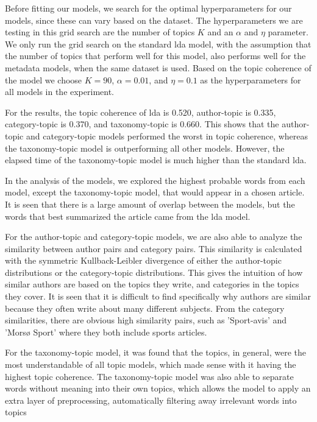 Before fitting our models, we search for the optimal hyperparameters for our models, since these can vary based on the dataset.
The hyperparameters we are testing in this grid search are the number of topics $K$ and an $\alpha$ and $\eta$ parameter.
We only run the grid search on the standard \gls{lda} model, with the assumption that the number of topics that perform well for this model, also performs well for the metadata models, when the same dataset is used.
Based on the topic coherence of the model we choose $K = 90$, $\alpha = 0.01$, and $\eta = 0.1$ as the hyperparameters for all models in the experiment.

For the results, the topic coherence of \gls{lda} is 0.520, author-topic is 0.335, category-topic is 0.370, and taxonomy-topic is 0.660.
This shows that the author-topic and category-topic models performed the worst in topic coherence, whereas the taxonomy-topic model is outperforming all other models.
However, the elapsed time of the taxonomy-topic model is much higher than the standard \gls{lda}.

In the analysis of the models, we explored the highest probable words from each model, except the taxonomy-topic model, that would appear in a chosen article.
It is seen that there is a large amount of overlap between the models, but the words that best summarized the article came from the \gls{lda} model.

For the author-topic and category-topic models, we are also able to analyze the similarity between author pairs and category pairs.
This similarity is calculated with the symmetric Kullback-Leibler divergence of either the author-topic distributions or the category-topic distributions.
This gives the intuition of how similar authors are based on the topics they write, and categories in the topics they cover.
It is seen that it is difficult to find specifically why authors are similar because they often write about many different subjects.
From the category similarities, there are obvious high similarity pairs, such as 'Sport-avis' and 'Morsø Sport' where they both include sports articles.

For the taxonomy-topic model, it was found that the topics, in general, were the most understandable of all topic models, which made sense with it having the highest topic coherence.
The taxonomy-topic model was also able to separate words without meaning into their own topics, which allows the model to apply an extra layer of preprocessing, automatically filtering away irrelevant words into topics


